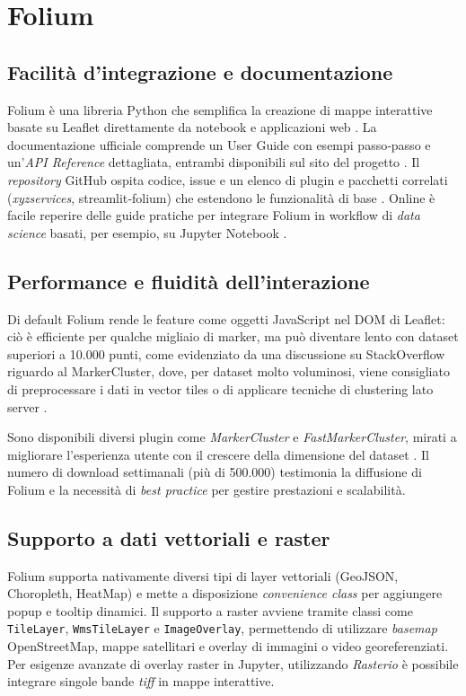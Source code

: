 \section{Folium}
\label{ch:folium}

\subsection{Facilità d'integrazione e documentazione}  
Folium è una libreria Python che semplifica la creazione di mappe interattive basate su Leaflet direttamente da notebook e applicazioni web \cite{folium-doc}.
La documentazione ufficiale comprende un User Guide con esempi passo‑passo e un'\textit{API Reference} dettagliata, entrambi disponibili sul sito del progetto \cite{folium-userguide}.  
Il \textit{repository} GitHub ospita codice, issue e un elenco di plugin e pacchetti correlati (\textit{xyzservices}, streamlit‑folium) che estendono le funzionalità di base \cite{folium-github,folium-pypistats}.  
Online è facile reperire delle guide pratiche per integrare Folium in workflow di \textit{data science} basati, per esempio, su Jupyter Notebook \cite{folium-tutorial,folium-realpython}.

\subsection{Performance e fluidità dell'interazione}  
Di default Folium rende le feature come oggetti JavaScript nel DOM di Leaflet: ciò è efficiente per qualche migliaio di marker, ma può diventare lento con dataset superiori a 10.000 punti, come evidenziato da una discussione su StackOverflow riguardo al MarkerCluster, dove, per dataset molto voluminosi, viene consigliato di preprocessare i dati in vector tiles o di applicare tecniche di clustering lato server \cite{folium-cluster-issue}.  

Sono disponibili diversi plugin come \textit{MarkerCluster} e \textit{FastMarkerCluster}, mirati a migliorare l'esperienza utente con il crescere della dimensione del dataset \cite{folium-cluster-issue,folium-pypistats}.  
Il numero di download settimanali (più di 500.000) testimonia la diffusione di Folium e la necessità di \textit{best practice} per gestire prestazioni e scalabilità.

\subsection{Supporto a dati vettoriali e raster}  
Folium supporta nativamente diversi tipi di layer vettoriali (GeoJSON, Choropleth, HeatMap) e mette a disposizione \textit{convenience class} per aggiungere popup e tooltip dinamici.  
Il supporto a raster avviene tramite classi come \texttt{TileLayer}, \texttt{WmsTileLayer} e \texttt{ImageOverlay}, permettendo di utilizzare \textit{basemap} OpenStreetMap, mappe satellitari e overlay di immagini o video georeferenziati.  
Per esigenze avanzate di overlay raster in Jupyter, utilizzando \textit{Rasterio} è possibile integrare singole bande \textit{tiff} in mappe interattive. \cite{folium-raster,folium-tutorial, folium-doc}

